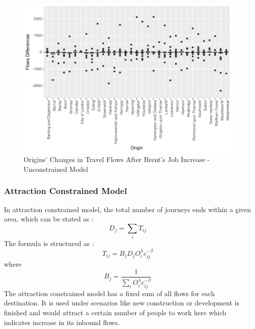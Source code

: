 \documentclass[a4paper,reqno,]{article}
\begin{document}
\begin{figure}[H]
\centering
\begin{minipage}[b]{1\linewidth}
\centering
    \captionsetup{width=1\linewidth}
    \includegraphics[width=1\textwidth]{images/SIM/un_orig.pdf}
    \caption{Origins' Changes in Travel Flows After Brent's Job Increase - Unconstrained Model}\label{fig: un_orig}
\end{minipage}
\end{figure}

\subsubsection{Attraction Constrained Model}
\label{sssec:attraction models}
In attraction constrained model, the total number of journeys ends within a given area, which can be stated as :
\begin{equation}
D_j=\sum_{i}T_{ij} 
\end{equation}
The formula is structured as :
\begin{equation}
T_{ij}=B_j D_j O_i^{\lambda} c_{ij}^{-\beta}
\end{equation}
where 
\begin{equation}
B_j=\frac{1}{\sum_{i}{O_i^{\lambda} c_{ij}^{-\beta}}}
\end{equation}
The attraction constrained model has a fixed sum of all flows for each destination. It is used under scenarios like new construction or development is finished and would attract a certain number of people to work here which indicates increase in its inbound flows. 
\end{document}
